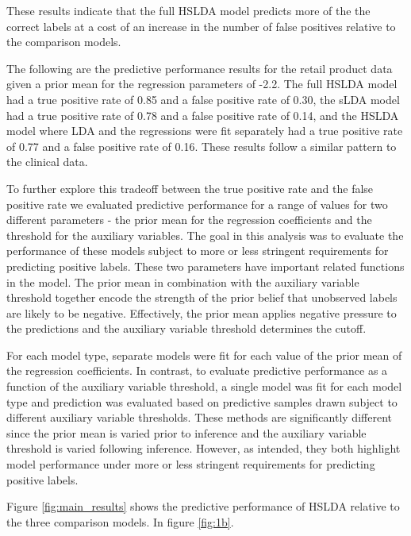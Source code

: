 These results indicate that the full HSLDA model predicts more of the the
correct labels at a cost of an increase in the number of false positives
relative to the comparison models.

The following are the predictive performance results for the retail product
data given a prior mean for the regression parameters of -2.2. 
The full HSLDA model had a true positive rate of 0.85 
and a false positive rate of 0.30, the sLDA model had a true positive
rate of 0.78 and a false positive rate of 0.14, and the HSLDA model where
LDA and the regressions were fit separately had a true positive rate of 0.77
and a false positive rate of 0.16. These results follow a similar pattern to the clinical data.

To further explore this tradeoff between the true positive rate and the
false positive rate we evaluated predictive performance for a range of values
for two different parameters - the prior mean for the regression coefficients
and the threshold for the auxiliary variables.  The goal in this analysis
was to evaluate the performance of these models subject to more or less
stringent requirements for predicting positive labels. These two parameters 
have important related functions in the model. The prior mean in combination 
with the auxiliary variable threshold together encode the strength of the prior
belief that unobserved labels are likely to be negative. Effectively, the
prior mean applies negative pressure to the predictions and the auxiliary
variable threshold determines the cutoff.

For each model type, separate models were fit for each value of the 
prior mean of the regression coefficients.  In contrast, to evaluate
predictive performance as a function of the auxiliary variable threshold,
a single model was fit for each model type and prediction was evaluated
based on predictive samples drawn subject to different auxiliary variable
thresholds. These methods are significantly different since the prior mean
is varied prior to inference and the auxiliary variable threshold is varied
following inference.  However, as intended, they both highlight model performance
under more or less stringent requirements for predicting positive labels.

Figure \ref{fig:main_results} shows the predictive performance of HSLDA 
relative to the three comparison models. In figure \ref{fig:1b}.


